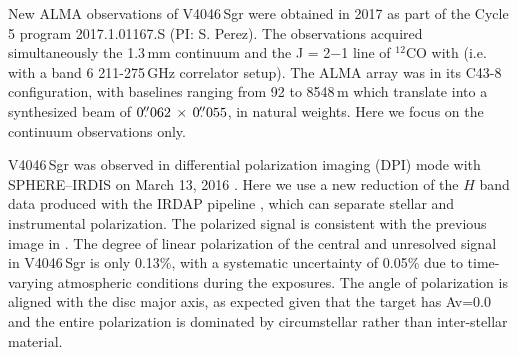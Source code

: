\documentclass[usenatbib,times]{mnras}
\begin{document}

New ALMA observations of V4046\,Sgr were obtained in 2017 as part of the Cycle 5 program 2017.1.01167.S (PI: S. Perez).  The observations  acquired simultaneously the 1.3\,mm continuum and the J = 2$-$1 line of $^{12}$CO with  (i.e. with a  band 6 211-275\,GHz correlator setup). The ALMA array was in its C43-8 configuration, with baselines ranging from 92 to 8548\,m which translate into a synthesized beam of $0\hbox{$.\!\!^{\prime\prime}$}062 \,\times \, 0\hbox{$.\!\!^{\prime\prime}$}055$, in  natural weights. Here we focus on the continuum observations only.

V4046\,Sgr was observed in differential polarization imaging (DPI) mode with SPHERE--IRDIS on March 13, 2016 \citep[see][for details]{Avenhaus_2018}. Here we use a new reduction of the $H$ band data produced with the IRDAP pipeline \citep{2020A&A...633A..64V}, which can separate stellar and instrumental polarization. The polarized signal is consistent with the previous image in \citet{Avenhaus_2018}. The degree of linear polarization of the central and unresolved signal in V4046\,Sgr is only 0.13\%, with a systematic uncertainty of 0.05\% due to time-varying atmospheric conditions during the exposures. The angle of polarization is aligned with the disc major axis, as expected given that the target has Av=0.0 \citep{2016ApJ...828...69M} and the entire polarization is dominated by circumstellar rather than inter-stellar material. 
\end{document}
